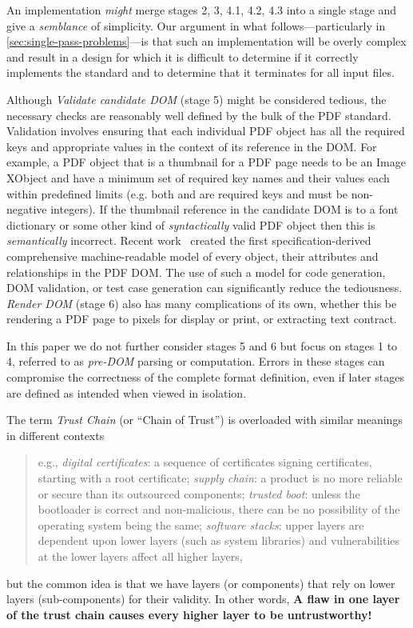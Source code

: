 An implementation \emph{might} merge stages 2, 3, 4.1, 4.2, 4.3 into
a single stage and give a \emph{semblance} of simplicity.
%
Our argument in what follows---particularly in
\cref{sec:single-pass-problems}---is
that such an implementation will be overly
complex and result in a design for which it is difficult
to determine if it correctly implements the standard
and to determine that it terminates for all input files.

Although \emph{Validate candidate DOM} (stage 5) might be considered tedious, the necessary checks are 
reasonably well defined by the bulk of the PDF standard. Validation involves ensuring that each 
individual PDF object has all the required keys and appropriate values in the context of its reference in the DOM.
For example, a PDF object that is a thumbnail for a PDF page needs to be an Image XObject and have a 
minimum set of required key names and their values each within predefined limits (e.g. both
 and  are required keys and must be non-negative integers). If the 
thumbnail reference in the candidate DOM is to a font dictionary or some other kind of
\emph{syntactically} valid PDF object then this is \emph{semantically} incorrect. Recent work~
\cite{peterwyattArlingtonPDFModel2021} created the first specification-derived comprehensive
machine-readable model of every object, their attributes and relationships in the PDF DOM. The use
of such a model for code generation, DOM validation, or test case generation can significantly reduce the tediousness.
\emph{Render DOM} (stage 6) also has many complications of its own,
whether this be rendering a PDF
page to pixels for display or print, or extracting text contract.

In this paper we do not further consider stages 5 and 6 but
focus on stages 1 to 4, referred to as \emph{pre-DOM} parsing or computation.
%
Errors in these stages can compromise the correctness of the complete format
definition, even if later stages are defined as intended when viewed in
isolation.


The term \emph{Trust Chain} (or ``Chain of Trust'') is
overloaded with similar meanings in different contexts
\begin{quote}
e.g.,
\emph{digital certificates}: a sequence of certificates signing certificates,
starting with a root certificate;
\emph{supply chain}: a product is no more reliable or secure than its
outsourced components;
\emph{trusted boot}: unless the bootloader is correct and non-malicious,
there can be no possibility of the operating system being the same;
\emph{software stacks}: upper layers are dependent upon lower layers (such as
system libraries) and vulnerabilities at the lower layers affect all higher
layers,
\end{quote}
but the common idea is that we have layers (or components)
that rely on lower layers (sub-components) for their validity.
In other words,
{\bf{A flaw in one layer of the trust chain
     causes every higher layer to be untrustworthy!}}

